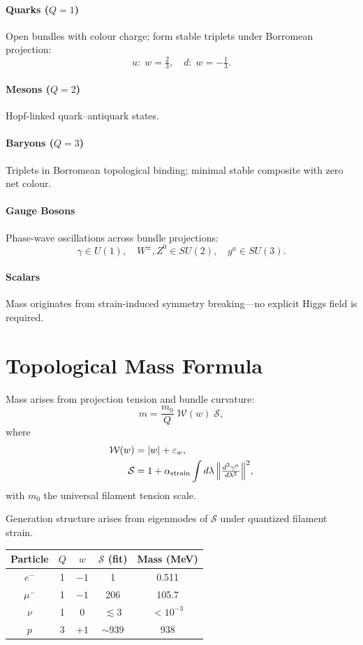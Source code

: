 \paragraph{Quarks ($Q=1$)}
Open bundles with colour charge; form stable triplets under Borromean projection:
\[
u:\; w=\tfrac23,\quad d:\; w=-\tfrac13.
\]

\paragraph{Mesons ($Q=2$)}
Hopf-linked quark--antiquark states.

\paragraph{Baryons ($Q=3$)}
Triplets in Borromean topological binding; minimal stable composite with zero net colour.

\paragraph{Gauge Bosons}
Phase-wave oscillations across bundle projections:
\[
\gamma \in U(1),\quad W^\pm, Z^0 \in SU(2),\quad g^a \in SU(3).
\]

\paragraph{Scalars}
Mass originates from strain-induced symmetry breaking—no explicit Higgs field is required.

\section{Topological Mass Formula}

Mass arises from projection tension and bundle curvature:
\[
m = \frac{m_0}{Q}\;\mathcal{W}(w)\;\mathcal{S},
\]
where
\begin{align}
\mathcal{W}(w) &= |w| + \varepsilon_w, \\
\mathcal{S} &= 1 + \alpha_{\text{strain}} \int d\lambda\, \Bigl\lVert \tfrac{d^2\gamma^\mu}{d\lambda^2} \Bigr\rVert^2,
\end{align}
with $m_0$ the universal filament tension scale.

Generation structure arises from eigenmodes of $\mathcal{S}$ under quantized filament strain.

\begin{center}
\begin{tabular}{|c|c|c|c|c|}
\hline
Particle & $Q$ & $w$ & $\mathcal S$ (fit) & Mass (MeV)\\\hline
$e^-$ & 1 & $-1$ & 1 & 0.511 \\
$\mu^-$ & 1 & $-1$ & 206 & 105.7 \\
$\nu$ & 1 & 0 & $\lesssim3$ & $<\!10^{-3}$ \\
$p$ & 3 & $+1$ & $\sim939$ & 938 \\\hline
\end{tabular}
\end{center}

